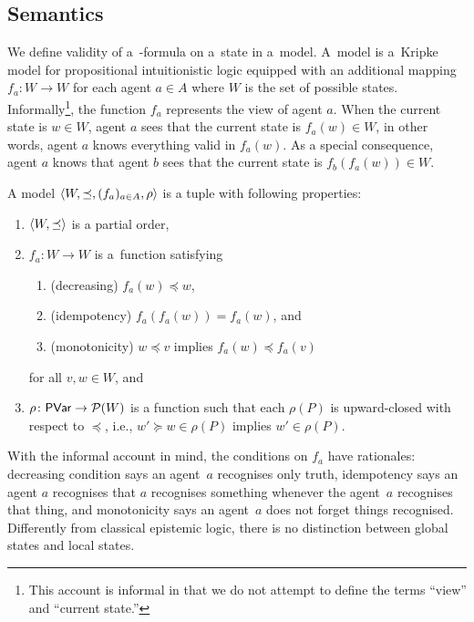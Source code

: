   \subsection{Semantics}
  We define validity of a~\iec-formula on a~state in a~model.
  A~model is a~Kripke model for propositional intuitionistic logic
  equipped with an additional
  mapping $f_a: W\rightarrow W$ for each agent $a\in A$ where $W$ is the
  set of possible states.
  Informally\footnote{This account is informal in that we do not attempt to
  define the terms ``view'' and ``current state.''},
  the function $f_a$ represents the view of agent
  $a$.
  When the current state is $w\in W$\kern -2pt, agent $a$ sees that the current state is
  $f_a(w)\in W$, in other words, agent $a$ knows everything valid in $f_a(w)$.
  As a special consequence, agent $a$ knows that agent $b$ sees that the current state
  is
  $f_b(f_a(w))\in W$\kern -2pt.

  \newcommand{\model}[1]{\tuple{W#1, \preceq#1, (f_a#1)_{a\in A}, \rho#1}}
  \begin{definition}
   \label{model}
   A model $\langle{W,\preceq, (f_a)_{a\in A}, \rho}\rangle$ is a tuple with following properties:
   \begin{enumerate}
    \item $\langle{W,\preceq}\rangle$ is a partial order,
    \item $f_a\colon W\rightarrow W$ is a~function satisfying
	  \begin{enumerate}
	   \item (decreasing) $f_a(w) \preceq w$,
	   \item (idempotency) $f_a(f_a(w)) = f_a(w)$, and
	   \item (monotonicity) $w\preceq v$ implies $f_a(w)\preceq f_a(v)$
	  \end{enumerate}
	  for all $v,w\in W$, and
    \item $\rho\colon \mathsf{PVar}\rightarrow {\mathcal P({W})}$ is a function such that each $\rho(P)$ is
	  upward-closed with respect to $\preceq$, i.e., $w'\succeq w\in\rho(P)$ implies
	  $w'\in\rho(P)$.
   \end{enumerate}
  \end{definition}
  \noindent With the informal account in mind, the conditions on $f_a$ have rationales:
  decreasing condition says an agent~$a$ recognises only truth,
  idempotency says an agent $a$ recognises that
       $a$ recognises something whenever the agent~$a$ recognises that thing,
       and monotonicity says an agent~$a$ does not forget things recognised.
       Differently from classical epistemic logic,
       there is no distinction between global states and local states.

